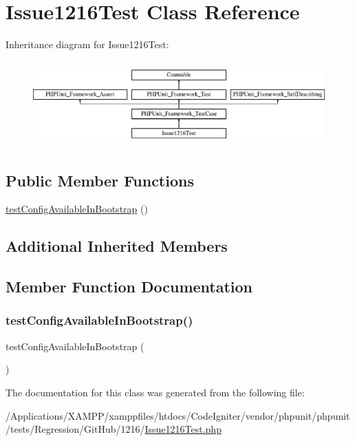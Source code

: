 \hypertarget{class_issue1216_test}{}\section{Issue1216\+Test Class Reference}
\label{class_issue1216_test}
Inheritance diagram for Issue1216\+Test\+:\begin{figure}[H]
\begin{center}
\leavevmode
\includegraphics[height=3.303835cm]{class_issue1216_test}
\end{center}
\end{figure}
\subsection*{Public Member Functions}
\begin{DoxyCompactItemize}
\item 
\mbox{\hyperlink{class_issue1216_test_a43eaac5c072ea3a41b4a52a4e37823ad}{test\+Config\+Available\+In\+Bootstrap}} ()
\end{DoxyCompactItemize}
\subsection*{Additional Inherited Members}


\subsection{Member Function Documentation}
\mbox{\label{class_issue1216_test_a43eaac5c072ea3a41b4a52a4e37823ad}} 
\subsubsection{\texorpdfstring{test\+Config\+Available\+In\+Bootstrap()}{testConfigAvailableInBootstrap()}}
{\footnotesize\ttfamily test\+Config\+Available\+In\+Bootstrap (\begin{DoxyParamCaption}{ }\end{DoxyParamCaption})}



The documentation for this class was generated from the following file\+:\begin{DoxyCompactItemize}
\item 
/\+Applications/\+X\+A\+M\+P\+P/xamppfiles/htdocs/\+Code\+Igniter/vendor/phpunit/phpunit/tests/\+Regression/\+Git\+Hub/1216/\mbox{\hyperlink{_issue1216_test_8php}{Issue1216\+Test.\+php}}\end{DoxyCompactItemize}
